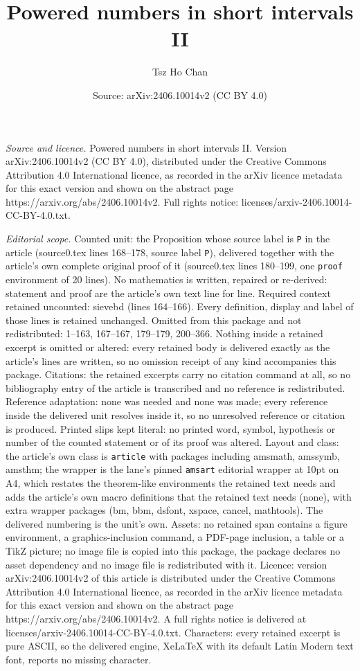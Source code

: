 \documentclass[10pt,a4paper]{amsart}
\title[Powered numbers in short intervals II]{Powered numbers in short intervals II}
\author{Tsz Ho Chan}
\date{Source: arXiv:2406.10014v2 (CC BY 4.0)}
\begin{document}
\maketitle

\noindent\emph{Source and licence.} Powered numbers in short intervals II. Version arXiv:2406.10014v2 (CC BY 4.0), distributed under the Creative Commons Attribution 4.0 International licence, as recorded in the arXiv licence metadata for this exact version and shown on the abstract page https://arxiv.org/abs/2406.10014v2. Full rights notice: licenses/arxiv-2406.10014-CC-BY-4.0.txt.\par\smallskip

\noindent\textit{Editorial scope.} Counted unit: the Proposition whose source label is \texttt{P} in the article (source0.tex lines 168--178, source label \texttt{P}), delivered together with the article's own complete original proof of it (source0.tex lines 180--199, one \texttt{proof} environment of 20 lines). No mathematics is written, repaired or re-derived: statement and proof are the article's own text line for line. Required context retained uncounted: sievebd (lines 164--166). Every definition, display and label of those lines is retained unchanged. Omitted from this package and not redistributed: 1--163, 167--167, 179--179, 200--366. Nothing inside a retained excerpt is omitted or altered: every retained body is delivered exactly as the article's lines are written, so no omission receipt of any kind accompanies this package. Citations: the retained excerpts carry no citation command at all, so no bibliography entry of the article is transcribed and no reference is redistributed. Reference adaptation: none was needed and none was made; every reference inside the delivered unit resolves inside it, so no unresolved reference or citation is produced. Printed slips kept literal: no printed word, symbol, hypothesis or number of the counted statement or of its proof was altered. Layout and class: the article's own class is \texttt{article} with packages including amsmath, amssymb, amsthm; the wrapper is the lane's pinned \texttt{amsart} editorial wrapper at 10pt on A4, which restates the theorem-like environments the retained text needs and adds the article's own macro definitions that the retained text needs (none), with extra wrapper packages (bm, bbm, dsfont, xspace, cancel, mathtools). The delivered numbering is the unit's own. Assets: no retained span contains a figure environment, a graphics-inclusion command, a PDF-page inclusion, a table or a TikZ picture; no image file is copied into this package, the package declares no asset dependency and no image file is redistributed with it. Licence: version arXiv:2406.10014v2 of this article is distributed under the Creative Commons Attribution 4.0 International licence, as recorded in the arXiv licence metadata for this exact version and shown on the abstract page https://arxiv.org/abs/2406.10014v2. A full rights notice is delivered at licenses/arxiv-2406.10014-CC-BY-4.0.txt. Characters: every retained excerpt is pure ASCII, so the delivered engine, XeLaTeX with its default Latin Modern text font, reports no missing character.
\end{document}
